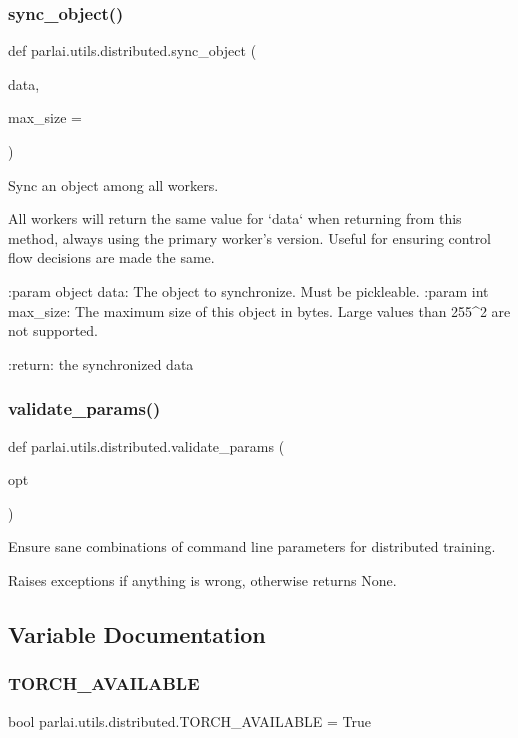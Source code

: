\subsubsection{\texorpdfstring{sync\+\_\+object()}{sync\_object()}}
{\footnotesize\ttfamily def parlai.\+utils.\+distributed.\+sync\+\_\+object (\begin{DoxyParamCaption}\item[{}]{data,  }\item[{}]{max\+\_\+size = {} }\end{DoxyParamCaption})}

\begin{DoxyVerb}Sync an object among all workers.

All workers will return the same value for `data` when returning from this
method, always using the primary worker's version. Useful for ensuring control
flow decisions are made the same.

:param object data:
    The object to synchronize. Must be pickleable.
:param int max_size:
    The maximum size of this object in bytes. Large values than 255^2 are not
    supported.

:return: the synchronized data
\end{DoxyVerb}
 \mbox{\label{namespaceparlai_1_1utils_1_1distributed_afd854992e4cc6571b120b9e179cd4a7a}} 
\subsubsection{\texorpdfstring{validate\+\_\+params()}{validate\_params()}}
{\footnotesize\ttfamily def parlai.\+utils.\+distributed.\+validate\+\_\+params (\begin{DoxyParamCaption}\item[{}]{opt }\end{DoxyParamCaption})}

\begin{DoxyVerb}Ensure sane combinations of command line parameters for distributed training.

Raises exceptions if anything is wrong, otherwise returns None.
\end{DoxyVerb}
 

\subsection{Variable Documentation}
\mbox{\label{namespaceparlai_1_1utils_1_1distributed_a4383b14f0cb5162d90f1141db981d942}} 
\subsubsection{\texorpdfstring{T\+O\+R\+C\+H\+\_\+\+A\+V\+A\+I\+L\+A\+B\+LE}{TORCH\_AVAILABLE}}
{\footnotesize\ttfamily bool parlai.\+utils.\+distributed.\+T\+O\+R\+C\+H\+\_\+\+A\+V\+A\+I\+L\+A\+B\+LE = True}

